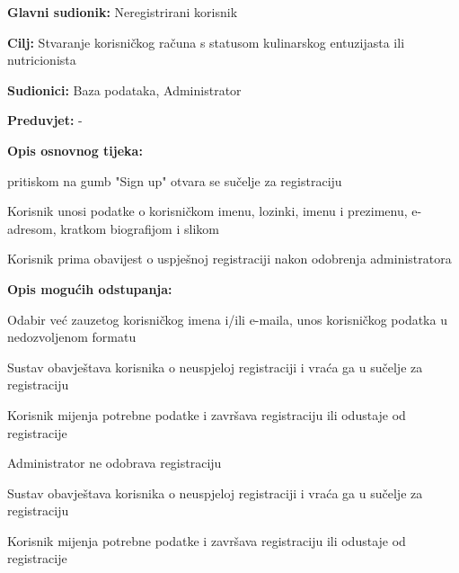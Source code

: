 					\noindent {}
					\begin{packed_item}
	
						\item \textbf{Glavni sudionik: }Neregistrirani korisnik
						\item  \textbf{Cilj:} Stvaranje korisničkog računa s statusom kulinarskog entuzijasta ili nutricionista
						\item  \textbf{Sudionici:} Baza podataka, Administrator
						\item  \textbf{Preduvjet:} -
						\item  \textbf{Opis osnovnog tijeka:} 
						
						\item[] \begin{packed_enum}
	
							\item pritiskom na gumb "Sign up" otvara se sučelje za registraciju
							\item Korisnik unosi podatke o korisničkom imenu, lozinki, imenu i prezimenu, e-adresom, kratkom biografijom i slikom
							\item Korisnik prima obavijest o uspješnoj registraciji nakon odobrenja administratora
						\end{packed_enum}
						
						\item  \textbf{Opis mogućih odstupanja:}
						
						\item[] \begin{packed_item}
	
							\item[2.a] Odabir već zauzetog korisničkog imena i/ili e-maila, unos korisničkog podatka u nedozvoljenom formatu
							\item[] \begin{packed_enum}
								
								\item Sustav obavještava korisnika o neuspjeloj registraciji i vraća ga u sučelje za registraciju
								\item Korisnik mijenja potrebne podatke i završava registraciju ili odustaje od registracije
								
							\end{packed_enum}
							\item[2.b] Administrator ne odobrava registraciju
							\item[] \begin{packed_enum}
								
								\item Sustav obavještava korisnika o neuspjeloj registraciji i vraća ga u sučelje za registraciju
								\item Korisnik mijenja potrebne podatke i završava registraciju ili odustaje od registracije
								
							\end{packed_enum}
							
						\end{packed_item}
					\end{packed_item}




